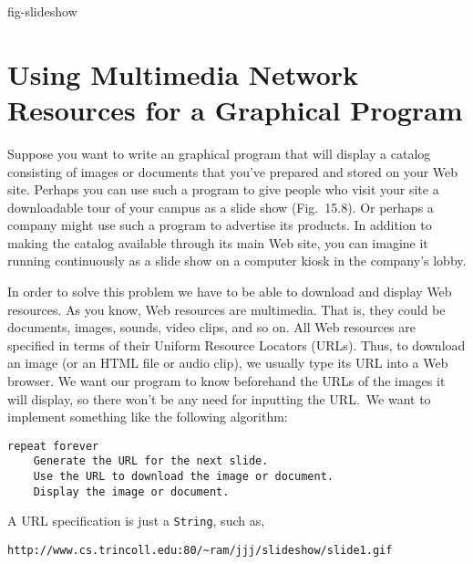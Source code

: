 {fig-slideshow}
\section{Using Multimedia Network Resources for a Graphical Program}
\label{using-multimedia-network-resourcesfora-graphical-program}
\noindent Suppose you want to write an graphical program that will display a
catalog consisting of images or documents that you've prepared and
stored on your Web site.   Perhaps you can use such a program to give
people who visit your site a downloadable tour of your campus as a
slide show
(Fig.~15.8). Or perhaps a company might use such a
program to advertise its products.  In addition to making the catalog
available through its main Web site, you can imagine it running
continuously as a slide show on a computer kiosk in the company's lobby.


In order to solve this problem we have to be able to download and
display Web resources.   As you know, Web resources are
multimedia.  That is, they could be documents, images, sounds, video
clips, and so on.  All Web resources are specified in terms of their
Uniform Resource Locators (URLs).  Thus, to download an image (or
an HTML file or audio clip), we usually type its URL into a Web
browser.  We want our program to know beforehand the URLs of the
images it will display, so there won't be any need for inputting
the URL.~We want to implement something like the following algorithm:

\begin{jjjlisting}
\begin{lstlisting}
repeat forever
    Generate the URL for the next slide.
    Use the URL to download the image or document.
    Display the image or document.
\end{lstlisting}
\end{jjjlisting}

\noindent A URL specification is just a {\tt String}, such as, 

\begin{jjjlisting}[28pc]
\begin{lstlisting}[commentstyle=\color{black}]
http://www.cs.trincoll.edu:80/~ram/jjj/slideshow/slide1.gif
\end{lstlisting}
\end{jjjlisting}

